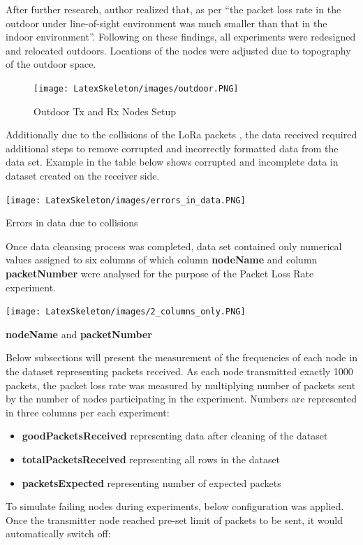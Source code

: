 \documentclass[oneside,12pt]{book}
\begin{document}
\noindent After further research, author realized that, as per \cite{BuildingEnvironments} “the packet loss rate in the outdoor under line-of-sight environment was much smaller than that in the indoor environment”. Following on these findings, all experiments were redesigned and relocated outdoors. Locations of the nodes were adjusted due to topography of the outdoor space.  
\begin{figure}[H]
    \centering
    \texttt{[image: LatexSkeleton/images/outdoor.PNG]}
    \caption{Outdoor Tx and Rx Nodes Setup}
\end{figure}
\noindent Additionally due to the collisions of the LoRa packets \citep{Collisions}, the data received required additional steps to remove corrupted and incorrectly formatted data from the data set. Example in the table below shows corrupted and incomplete data in dataset created on the receiver side.
\begin{table}[H]
  \centering
  \label{tbl:Errors in data due to collisions}
  \texttt{[image: LatexSkeleton/images/errors\_in\_data.PNG]}
  \caption{Errors in data due to collisions}
\end{table}
\noindent Once data cleansing process was completed, data set contained only numerical values assigned to six columns of which column \textbf{nodeName} and column \textbf{packetNumber} were analysed for the purpose of the Packet Loss Rate experiment.
\begin{table}[H]
  \centering
  \label{tbl:nodeName and packetNumber columns}
  \texttt{[image: LatexSkeleton/images/2\_columns\_only.PNG]}
  \caption{\textbf{nodeName} and \textbf{packetNumber}}
\end{table}
\noindent Below subsections will present the measurement of the frequencies of each node in the dataset representing packets received. As each node transmitted exactly 1000 packets, the packet loss rate was measured by multiplying number of packets sent by the number of nodes participating in the experiment. Numbers are represented in three columns per each experiment: 
\begin{itemize}
  \item \textbf{goodPacketsReceived} representing data after cleaning of the dataset
  \item \textbf{totalPacketsReceived} representing all rows in the dataset
  \item  \textbf{packetsExpected} representing number of expected packets
\end{itemize}
To simulate failing nodes during experiments, below configuration was applied. Once the transmitter node reached pre-set limit of packets to be sent, it would automatically switch off:
\end{document}
